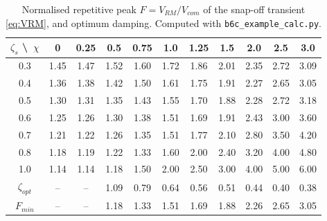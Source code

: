 \documentclass[10pt,a4paper]{scrartcl}
\begin{document}
\begin{table}[htb]
\centering\footnotesize
\caption{Normalised repetitive peak $F = V_{RM}/V_{com}$ of the snap-off transient \eqref{eq:VRM}, and optimum damping. Computed with \texttt{b6c\_example\_calc.py}.}
\label{tab:snubF}
\begin{tabular}{@{}c*{10}{c}@{}}
\toprule
$\zeta_s$ \textbackslash\ $\chi$ & 0 & 0.25 & 0.5 & 0.75 & 1.0 & 1.25 & 1.5 & 2.0 & 2.5 & 3.0 \\
\midrule
0.3 & 1.45 & 1.47 & 1.52 & 1.60 & 1.72 & 1.86 & 2.01 & 2.35 & 2.72 & 3.09 \\
0.4 & 1.36 & 1.38 & 1.42 & 1.50 & 1.61 & 1.75 & 1.91 & 2.27 & 2.65 & 3.05 \\
0.5 & 1.30 & 1.31 & 1.35 & 1.43 & 1.55 & 1.70 & 1.88 & 2.28 & 2.72 & 3.18 \\
0.6 & 1.25 & 1.26 & 1.30 & 1.38 & 1.51 & 1.69 & 1.91 & 2.43 & 3.00 & 3.60 \\
0.7 & 1.21 & 1.22 & 1.26 & 1.35 & 1.51 & 1.77 & 2.10 & 2.80 & 3.50 & 4.20 \\
0.8 & 1.18 & 1.19 & 1.22 & 1.33 & 1.60 & 2.00 & 2.40 & 3.20 & 4.00 & 4.80 \\
1.0 & 1.14 & 1.14 & 1.18 & 1.50 & 2.00 & 2.50 & 3.00 & 4.00 & 5.00 & 6.00 \\
\midrule
$\zeta_{opt}$ & -- & -- & 1.09 & 0.79 & 0.64 & 0.56 & 0.51 & 0.44 & 0.40 & 0.38 \\
$F_{min}$ & -- & -- & 1.18 & 1.33 & 1.51 & 1.69 & 1.88 & 2.26 & 2.65 & 3.05 \\
\bottomrule
\end{tabular}
\end{table}
\end{document}

